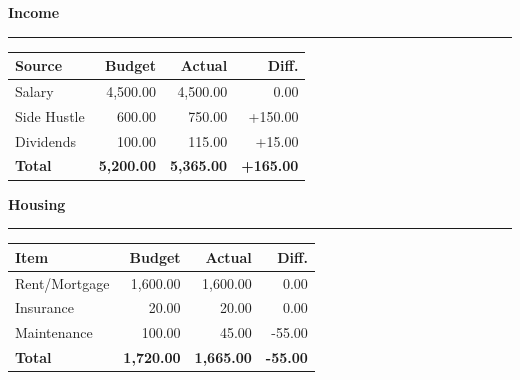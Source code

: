 \documentclass[11pt]{article}
\begin{document}
\vspace{1.5em}

\begin{minipage}[t]{0.48\textwidth}

  {\large\textbf{\color{accent}Income}} \par
  \vspace{0.2em}
  {\color{accent!30}\rule{\linewidth}{1.2pt}} \par
  \vspace{0.4em}
  \begin{tabularx}{\linewidth}{X r r r}
    \textbf{Source} & \textbf{Budget} & \textbf{Actual} & \textbf{Diff.} \\
    \midrule
    Salary & 4,500.00 & 4,500.00 & 0.00 \\
    Side Hustle & 600.00 & 750.00 & +150.00 \\
    Dividends & 100.00 & 115.00 & +15.00 \\
    \midrule
    \textbf{Total} & \textbf{5,200.00} & \textbf{5,365.00} & \textbf{+165.00} \\
  \end{tabularx}
  
  \vspace{1.5em}
  
  {\large\textbf{\color{accent}Housing}} \par
  \vspace{0.2em}
  {\color{accent!30}\rule{\linewidth}{1.2pt}} \par
  \vspace{0.4em}
  \begin{tabularx}{\linewidth}{X r r r}
    \textbf{Item} & \textbf{Budget} & \textbf{Actual} & \textbf{Diff.} \\
    \midrule
    Rent/Mortgage & 1,600.00 & 1,600.00 & 0.00 \\
    Insurance & 20.00 & 20.00 & 0.00 \\
    Maintenance & 100.00 & 45.00 & -55.00 \\
    \midrule
    \textbf{Total} & \textbf{1,720.00} & \textbf{1,665.00} & \textbf{-55.00} \\
  \end{tabularx}
  
  \vspace{1.5em}


\end{minipage}
\end{document}
